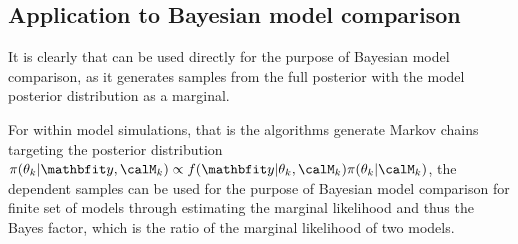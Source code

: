 \subsection{Application to Bayesian model comparison}
\label{sub:MCMC Application to Bayesian model comparison}

It is clearly that \rjmcmc can be used directly for the purpose of Bayesian
model comparison, as it generates samples from the full posterior with the
model posterior distribution as a marginal.

For within model simulations, that is the algorithms generate Markov chains
targeting the posterior distribution $\pi(\theta_k|\data,\calM_k) \propto
f(\data|\theta_k,\calM_k)\pi(\theta_k|\calM_k)$, the dependent samples can be
used for the purpose of Bayesian model comparison for finite set of models
through estimating the marginal likelihood and thus the Bayes factor, which is
the ratio of the marginal likelihood of two models.

